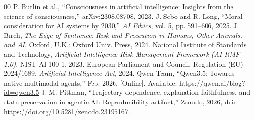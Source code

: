\documentclass[conference]{IEEEtran}
\begin{document}
\begin{thebibliography}{00}
 P. Butlin et al., ``Consciousness in artificial intelligence: Insights from the science of consciousness,'' arXiv:2308.08708, 2023.
 J. Sebo and R. Long, ``Moral consideration for AI systems by 2030,'' \emph{AI Ethics}, vol. 5, pp. 591--606, 2025.
 J. Birch, \emph{The Edge of Sentience: Risk and Precaution in Humans, Other Animals, and AI}. Oxford, U.K.: Oxford Univ. Press, 2024.
 National Institute of Standards and Technology, \emph{Artificial Intelligence Risk Management Framework (AI RMF 1.0)}, NIST AI 100-1, 2023.
 European Parliament and Council, Regulation (EU) 2024/1689, \emph{Artificial Intelligence Act}, 2024.
 Qwen Team, ``Qwen3.5: Towards native multimodal agents,'' Feb. 2026. [Online]. Available: \url{https://qwen.ai/blog?id=qwen3.5}
 J. M. Pittman, ``Trajectory dependence, explanation faithfulness, and state preservation in agentic AI: Reproducibility artifact,'' Zenodo, 2026, doi: https://doi.org/10.5281/zenodo.23196167.
\end{thebibliography}
\end{document}
